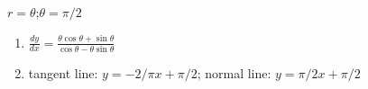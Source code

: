 {$r=\theta$;\quad $\theta = \pi/2$}
{\begin{enumerate}
	\item $\frac{dy}{dx} = \frac{\theta\cos\theta+\sin\theta}{\cos\theta-\theta\sin\theta}$
	\item	tangent line: $y=-2/\pi x+\pi/2$; normal line: $y=\pi/2x+\pi/2$
\end{enumerate}}

